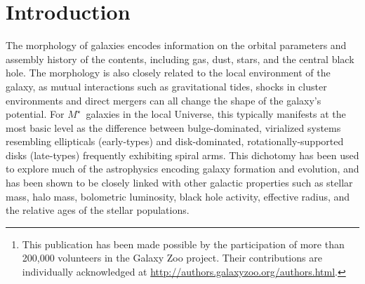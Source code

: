\documentclass[twocolumn]{aastex6}
\begin{document}
\begin{abstract}

We present the data release paper for the Galaxy Zoo: Hubble (GZH) project.\footnote{This publication has been made possible by the participation of more than 200,000 volunteers in the Galaxy Zoo project. Their contributions are individually acknowledged at \url{http://authors.galaxyzoo.org/authors.html}.} This is the third phase in a large effort to measure reliable morphologies of galaxies on detailed scales by using crowdsourced visual classifications of color composite image. Images in GZH are selected from various \textit{Hubble Space Telescope} Legacy programs using the Advanced Camera for Surveys (AEGIS, COSMOS, GEMS, GOODS-N, and GOODS-S), with filters selected to probe the rest-frame optical emission from galaxies out to $z\simeq1$. The galaxies selected for GZH classifications go down to magnitude limits of $m_{I}<23.5$ and have a median redshift of $\langle z\rangle=0.9\pm0.6$, with a tail extending out to $z\simeq4$. The GZH morphological data includes measurements of both bulge- and disk-dominated galaxies, details on spiral disk structure that relate to the Hubble type, and numerous measurements of clump identification and geometry. This paper also describes and employs a novel method for calibrating morphological bias by using artificially-redshifted galaxy images as a baseline. This paper presents both the raw and calibrated morphological vote fractions for $150,771$ galaxies, constituting a large data set suitable for large-scale studies of galaxy evolution. 

\end{abstract}


\section{Introduction} \label{sec:intro}

The morphology of galaxies encodes information on the orbital parameters and assembly history of the contents, including gas, dust, stars, and the central black hole. The morphology is also closely related to the local environment of the galaxy, as mutual interactions such as gravitational tides, shocks in cluster environments and direct mergers can all change the shape of the galaxy's potential. For $M^\star$~galaxies in the local Universe, this typically manifests at the most basic level as the difference between bulge-dominated, virialized systems resembling ellipticals (early-types) and disk-dominated, rotationally-supported disks (late-types) frequently exhibiting spiral arms. This dichotomy has been used to explore much of the astrophysics encoding galaxy formation and evolution, and has been shown to be closely linked with other galactic properties such as stellar mass, halo mass, bolometric luminosity, black hole activity, effective radius, and the relative ages of the stellar populations. 
\end{document}
